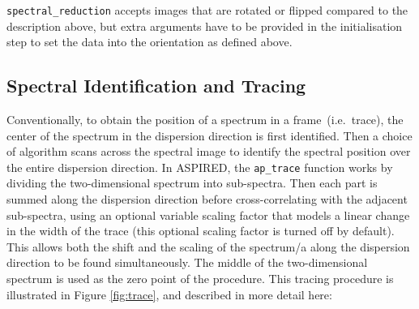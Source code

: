 \documentclass[linenumbers, twocolumn]{aastex631}
\begin{document}
\texttt{spectral\_reduction} accepts images that are rotated or flipped
compared to the description above, but extra arguments have to be provided
in the initialisation step to set the data into the orientation as defined
above.

\subsection{Spectral Identification and Tracing}
\label{sec:tracing}
Conventionally, to obtain the position of a spectrum in a frame~(i.e.\ trace),
the center of the spectrum in the dispersion direction is first identified. Then
a choice of algorithm scans across the spectral image to identify
the spectral position over the entire dispersion direction. In \textsc{ASPIRED},
the \texttt{ap\_trace} function works by dividing the two-dimensional spectrum
into sub-spectra. Then each part is summed along the dispersion direction
before cross-correlating with the adjacent sub-spectra, using an optional variable
scaling factor that models a linear change in the width of the trace (this optional scaling factor is turned off by default). This allows both the shift and the scaling of
the spectrum/a along the dispersion direction to be found simultaneously. The
middle of the two-dimensional spectrum is used as the zero point of the
procedure. This tracing procedure is illustrated in Figure \ref{fig:trace}, and described in more detail here:
\end{document}
